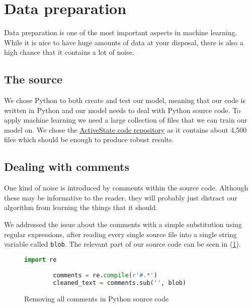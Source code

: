 \section{Data preparation} \label{sec:data_preparation}

  Data preparation is one of the most important aspects in machine
  learning.  While it is nice to have huge amounts of data at your
  disposal, there is also a high chance that it contains a lot of noise.

  \subsection{The source}

    We chose Python to both create and test our model, meaning that
    our code is written in Python and our model needs to
    deal with Python source code. To apply machine learning we need a
    large collection of files that we can train our model on. We chose
    the \href{https://github.com/ActiveState/code}{ActiveState code repository} 
    as it contains about 4,500 files which should be enough to
    produce robust results.

  \subsection{Dealing with comments} \label{sub:dealing_with_comments}

    One kind of noise is introduced by comments within the source
    code. Although these may be informative to the reader, they will
    probably just distract our algorithm from learning the things that
    it should.

    We addressed the issue about the comments with a simple substitution
    using regular expressions, after reading every single source file
    into a single string variable called \verb+blob+. The relevant part
    of our source code can be seen in (\ref{fig:comments}).

    \begin{figure}[htpb]
      \centering \begin{lstlisting}[language=Python]
        import re

        comments = re.compile(r'#.*')
        cleaned_text = comments.sub('', blob) \end{lstlisting} 
        \caption{Removing all comments in Python source
      code} \label{fig:comments}
    \end{figure}

